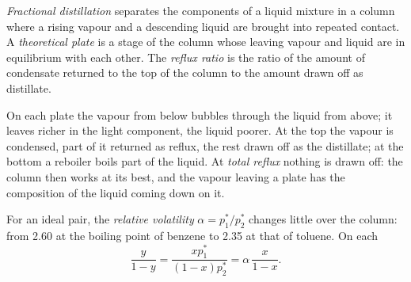 \begin{definition}\label{def:b2:liquid-vapour-diagrams:fractional-distillation}
\emph{Fractional distillation} separates the
components of a liquid mixture in a column where a rising vapour and a
descending liquid are brought into repeated contact. A \emph{theoretical
plate} is a stage of the column whose leaving vapour
and liquid are in equilibrium with each other. The \emph{reflux
ratio} is the ratio of the amount of condensate returned
to the top of the column to the amount drawn off as distillate.
\end{definition}

On each plate the vapour from below bubbles through the liquid from above; it
leaves richer in the light component, the liquid poorer. At the top the vapour
is condensed, part of it returned as reflux, the rest drawn off as the
distillate; at the bottom a reboiler boils part of the liquid. At
\textit{total reflux} nothing is drawn off: the column then works at its best,
and the vapour leaving a plate has the composition of the liquid coming down
on it.


For an ideal pair, the \textit{relative volatility} $\alpha = p_1^*/p_2^*$
changes little over the column: from 2.60 at the boiling point of benzene to
2.35 at that of toluene. On each 
\[
  \frac{y}{1 - y} = \frac{xp_1^*}{(1 - x)p_2^*} = \alpha\,\frac{x}{1 - x} .
\]


